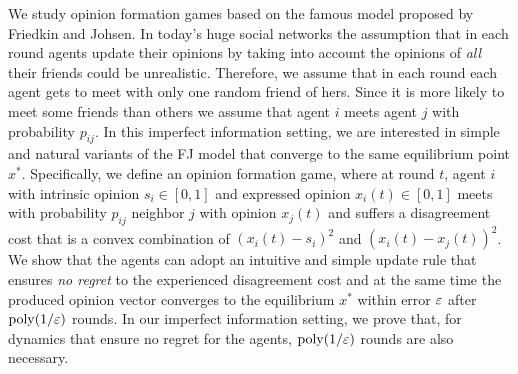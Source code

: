 We study opinion formation games based on the famous model proposed by Friedkin
and Johsen.  In today's huge social networks the assumption that in each round
agents update their opinions by taking into account the opinions of \emph{all}
their friends could be unrealistic. Therefore, we assume that in each round
each agent gets to meet with only one random friend of hers. Since it is more
likely to meet some friends than others we assume that agent $i$ meets agent
$j$ with probability $p_{ij}$.  In this imperfect information setting, we are
interested in simple and natural variants of the FJ model that converge to the
same equilibrium point $x^*$.  Specifically, we define an opinion formation
game, where at round $t$, agent $i$ with intrinsic opinion $s_i\in[0,1]$ and
expressed opinion $x_i(t) \in[0,1]$ meets with probability $p_{ij}$ neighbor
$j$ with opinion $x_j(t)$ and suffers a disagreement cost that is a convex
combination of $(x_i(t) - s_i)^2$ and $(x_i(t) - x_j(t))^2$.  We show that the
agents can adopt an intuitive and simple update rule that ensures
\emph{no regret} to the experienced disagreement cost and at the same time the
produced opinion vector converges to the equilibrium $x^*$ within error $\varepsilon$
after $\mathrm{poly}(1/\varepsilon)$ rounds.  In our imperfect information setting, we
prove that, for dynamics that ensure no regret for the agents,
$\mathrm{poly}(1/\varepsilon)$ rounds are also necessary.

